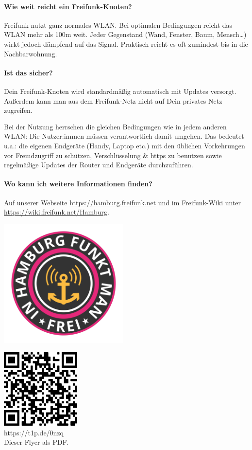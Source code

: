 \documentclass[10pt,a4paper,notumble]{leaflet}
\begin{document}
\paragraph{Wie weit reicht ein Freifunk-Knoten?} Freifunk nutzt ganz normales WLAN. Bei optimalen Bedingungen reicht das WLAN mehr als 100m weit. Jeder Gegenstand (Wand, Fenster, Baum, Mensch…) wirkt jedoch dämpfend auf das Signal. Praktisch reicht es oft zumindest bis in die Nachbarwohnung.

\paragraph{Ist das sicher?} Dein Freifunk-Knoten wird standardmäßig automatisch mit Updates versorgt. Außerdem kann man aus dem Freifunk-Netz nicht auf Dein privates Netz zugreifen.

Bei der Nutzung herrschen die gleichen Bedingungen wie in jedem anderen WLAN: Die Nutzer:innnen müssen verantwortlich damit umgehen. Das bedeutet u.a.: die eigenen Endgeräte (Handy, Laptop etc.) mit den üblichen Vorkehrungen vor Fremdzugriff zu schützen, Verschlüsselung \& https zu benutzen sowie regelmäßige Updates der Router und Endgeräte durchzuführen.

\paragraph{Wo kann ich weitere Informationen finden?} Auf unserer Webseite \href{https://hamburg.freifunk.net}{https://hamburg.freifunk.net} und im Freifunk-Wiki unter \href{https://wiki.freifunk.net/Hamburg}{https://wiki.freifunk.net/Hamburg}.

\newpage
\begin{center}
\includegraphics[width=65mm]{in-hamburg-funkt-man-frei.png}
\end{center}
\vspace{3em}
\begin{center}
\includegraphics[width=40mm]{qr.png}\\
\footnotesize https://t1p.de/0nzq\\Dieser Flyer als PDF.
\end{center}
\vfill
\end{document}
